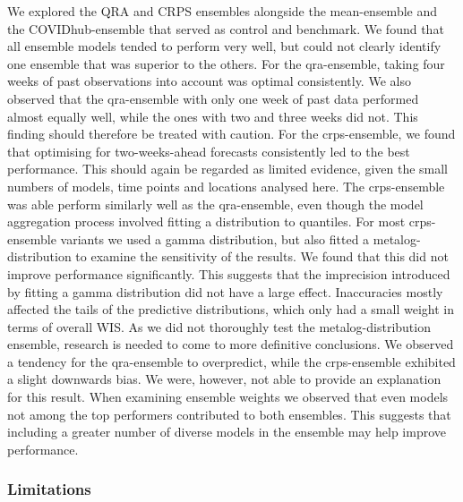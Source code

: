 \documentclass[
]{book}
\begin{document}
We explored the QRA and CRPS ensembles alongside the mean-ensemble and the COVIDhub-ensemble that served as control and benchmark. We found that all ensemble models tended to perform very well, but could not clearly identify one ensemble that was superior to the others. For the qra-ensemble, taking four weeks of past observations into account was optimal consistently. We also observed that the qra-ensemble with only one week of past data performed almost equally well, while the ones with two and three weeks did not. This finding should therefore be treated with caution. For the crps-ensemble, we found that optimising for two-weeks-ahead forecasts consistently led to the best performance. This should again be regarded as limited evidence, given the small numbers of models, time points and locations analysed here. The crps-ensemble was able perform similarly well as the qra-ensemble, even though the model aggregation process involved fitting a distribution to quantiles. For most crps-ensemble variants we used a gamma distribution, but also fitted a metalog-distribution to examine the sensitivity of the results. We found that this did not improve performance significantly. This suggests that the imprecision introduced by fitting a gamma distribution did not have a large effect. Inaccuracies mostly affected the tails of the predictive distributions, which only had a small weight in terms of overall WIS. As we did not thoroughly test the metalog-distribution ensemble, research is needed to come to more definitive conclusions. We observed a tendency for the qra-ensemble to overpredict, while the crps-ensemble exhibited a slight downwards bias. We were, however, not able to provide an explanation for this result. When examining ensemble weights we observed that even models not among the top performers contributed to both ensembles. This suggests that including a greater number of diverse models in the ensemble may help improve performance.

\hypertarget{limitations}{%
\subsubsection*{Limitations}\label{limitations}}
\end{document}
